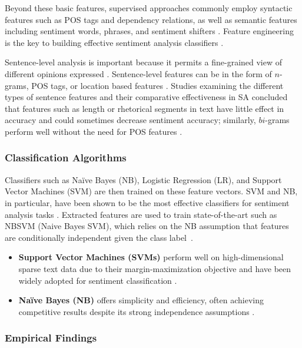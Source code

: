 \documentclass[a4paper,twoside,12pt]{book}
\newcommand{\logreg}{LR}
\begin{document}
Beyond these basic features, supervised approaches commonly employ syntactic features such as POS tags and dependency relations, as well as semantic features including sentiment words, phrases, and sentiment shifters \cite{azzeddine2018sentiment}. Feature engineering is the key to building effective sentiment analysis classifiers \cite{azzeddine2018sentiment}.

Sentence-level analysis is important because it permits a fine-grained view of different opinions expressed \cite{CHATURVEDI201865}. Sentence-level features can be in the form of $n$-grams, POS tags, or location based features \cite{CHATURVEDI201865}. Studies examining the different types of sentence features and their comparative effectiveness in SA concluded that features such as length or rhetorical segments in text have little effect in accuracy and could sometimes decrease sentiment accuracy; similarly, $bi$-grams perform well without the need for POS features \cite{CHATURVEDI201865}.

\subsubsection{Classification Algorithms}

Classifiers such as Naïve Bayes (NB), Logistic Regression (\logreg{}), and Support Vector Machines (SVM) are then trained on these feature vectors. SVM and NB, in particular, have been shown to be the most effective classifiers for sentiment analysis tasks \cite{behdenna2018document}. Extracted features are used to train state-of-the-art such as NBSVM (Naive Bayes SVM), which relies on the NB assumption that features are conditionally independent given the class label~\cite{CHATURVEDI201865}.

\begin{itemize}
\item \textbf{Support Vector Machines (SVMs)} perform well on high-dimensional sparse text data due to their margin-maximization objective and have been widely adopted for sentiment classification \cite{behdenna2018document}. 

\item \textbf{Naïve Bayes (NB)} offers simplicity and efficiency, often achieving competitive results despite its strong independence assumptions \cite{behdenna2018document}. 
\end{itemize}

\subsubsection{Empirical Findings}
\end{document}
